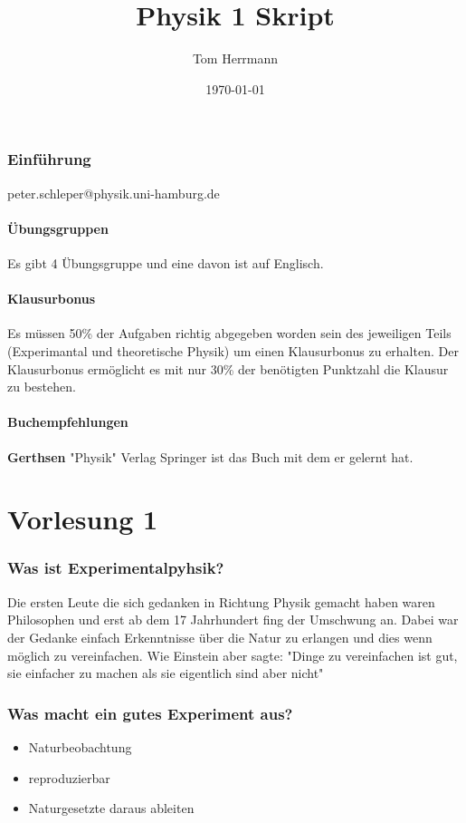 \documentclass[11pt]{article}
\title{Physik 1 Skript}
\date{\today}
\begin{document}
\lstset{language=Java}
\author{Tom Herrmann}

\maketitle

\tableofcontents

\newpage

\section{Einführung}
	peter.schleper@physik.uni-hamburg.de
	\subsection{Übungsgruppen}
		Es gibt 4 Übungsgruppe und eine davon ist auf Englisch.
	\subsection{Klausurbonus}
		Es müssen 50\%  der Aufgaben richtig abgegeben worden sein des jeweiligen Teils (Experimantal und theoretische Physik) um einen Klausurbonus zu erhalten.
		Der Klausurbonus ermöglicht es mit nur 30\% der benötigten Punktzahl die Klausur zu bestehen.
	\subsection{Buchempfehlungen}
		\textbf{Gerthsen} "Physik" Verlag Springer ist das Buch mit dem er gelernt hat.
\part{Vorlesung 1}
	\section{Was ist Experimentalpyhsik?}
	Die ersten Leute die sich gedanken in Richtung Physik gemacht haben waren Philosophen und erst ab dem 17 Jahrhundert fing der Umschwung an. 
	Dabei war der Gedanke einfach Erkenntnisse über die Natur zu erlangen und dies wenn möglich zu vereinfachen. Wie Einstein aber sagte: "Dinge zu vereinfachen ist gut, sie einfacher zu machen als sie eigentlich sind aber nicht"
 	\section{Was macht ein gutes Experiment aus?}
 		\begin{itemize}
 			\item Naturbeobachtung
 			\item reproduzierbar
 			\item Naturgesetzte daraus ableiten
 		\end{itemize}
\end{document}
